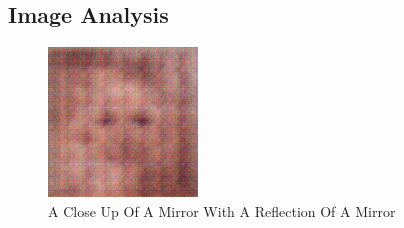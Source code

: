 \documentclass{article}%
\begin{document}
%
\subsection{Image Analysis}%
\label{subsec:ImageAnalysis}%


\begin{figure}[h!]%
\centering%
\includegraphics[width=150px]{500_fake_images/samples_5_219.png}%
\caption{A Close Up Of A Mirror With A Reflection Of A Mirror}%
\end{figure}

%
\end{document}
